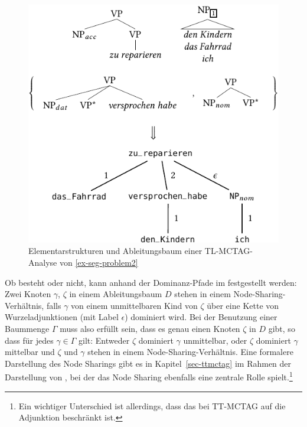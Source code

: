 \begin{figure}[t]
\centering
\includegraphics{graphics/abb616.pdf}
\caption{Elementarstrukturen und Ableitungsbaum einer TL-MCTAG-Analyse von \ref{ex-seg-problem2}\label{fig-snmctag-2}}
\end{figure}

Ob  besteht oder nicht, kann anhand der Dominanz-Pfade im festgestellt werden: Zwei Knoten $\gamma$, $\zeta$ in einem Ableitungsbaum $D$ stehen in einem Node-Sharing-Verhältnis, falls $\gamma$ von einem unmittelbaren Kind von $\zeta$ über eine Kette von Wurzeladjunktionen (mit Label $\epsilon$) dominiert wird. Bei der Benutzung einer Baummenge $\Gamma$ muss also erfüllt sein, dass es genau einen Knoten $\zeta$ in $D$ gibt, so dass für jedes $\gamma \in \Gamma$ gilt: Entweder $\zeta$ dominiert $\gamma$ unmittelbar, oder $\zeta$ dominiert $\gamma$ mittelbar und $\zeta$ und $\gamma$ stehen in einem Node-Sharing-Verhältnis. Eine formalere Darstellung des Node Sharings gibt es in Kapitel~\ref{sec-ttmctag} im Rahmen der Darstellung von , bei der das Node Sharing ebenfalls eine zentrale Rolle spielt.\footnote{Ein wichtiger Unterschied ist allerdings, dass das  bei TT-MCTAG auf die Adjunktion beschränkt ist.} 

